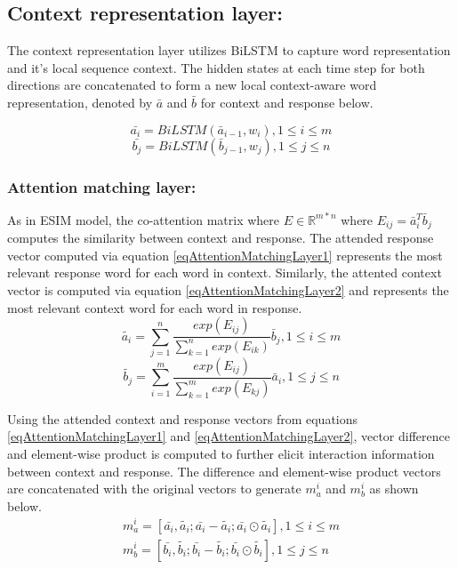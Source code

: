 \documentclass[letterpaper]{article} %
\begin{document}
\subsection{Context representation layer:}
The context representation layer utilizes BiLSTM to capture word representation and it's local sequence context. The hidden states at each time step for both directions are concatenated to form a new local context-aware word representation, denoted by $\bar{a}$ and $\bar{b}$ for context and response 
below.

\begin{equation}
\label{eqContextRepresentationLayer1}
\bar{a_i} = BiLSTM(\bar{a}_{i-1}, w_i), 1 \leq i \leq m
\end{equation}
\begin{equation}
\label{eqContextRepresentationLayer2}
\bar{b_j} = BiLSTM(\bar{b}_{j-1}, w_j), 1 \leq j \leq n
\end{equation}

\subsubsection{Attention matching layer:}
As in ESIM model, the co-attention matrix where $E \in \mathbb{R}^{m*n}$ where $E_{ij} =\bar{a}_i^T\bar{b}_j$ computes the similarity between context and response. The attended response vector computed via equation \ref{eqAttentionMatchingLayer1} represents the most relevant response word for each word in context. Similarly, the attented context vector is computed via equation \ref{eqAttentionMatchingLayer2} and represents the most relevant context word for each word in response.
\begin{equation}
\label{eqAttentionMatchingLayer1}
\tilde{a_i} = \sum_{j=1}^n \frac{exp(E_{ij})}{\sum_{k=1}^n exp(E_{ik})}\bar{b}_j, 1 \leq i \leq m
\end{equation}
\begin{equation}
\label{eqAttentionMatchingLayer2}
\tilde{b_j} = \sum_{i=1}^m \frac{exp(E_{ij})}{\sum_{k=1}^m exp(E_{kj})}\bar{a}_i, 1 \leq j \leq n
\end{equation}

Using the attended context and response vectors from equations \ref{eqAttentionMatchingLayer1} and \ref{eqAttentionMatchingLayer2}, vector difference and element-wise product is computed
to further elicit interaction information between context and response. The difference and element-wise product vectors are concatenated with the original vectors to generate $m_a^i$ and $m_b^i$ as shown below. %
\begin{gather}
\label{eq:5}
m_a^i = [\bar{a_i},\tilde{a_i};\bar{a_i}-\tilde{a_i}; \bar{a_i}\odot\tilde{a_i}], 1 \leq i \leq m \\
\label{eq:6}
m_b^i = [\bar{b_i},\tilde{b_i};\bar{b_i}-\tilde{b_i}; \bar{b_i}\odot\tilde{b_i}], 1 \leq j \leq n
\end{gather}
\end{document}
